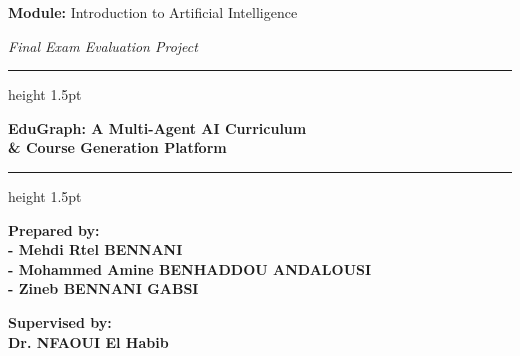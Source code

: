 \documentclass[12pt,a4paper]{report}
\begin{document}
\begin{titlepage}
    {\large \textbf{Module:} Introduction to Artificial Intelligence \par}
    {\small \textsl{Final Exam Evaluation Project} \par}

    \vspace{2cm}
    
    \hrule height 1.5pt
    \vspace{0.4cm}
    {\huge \bfseries \textcolor{academic_blue}{EduGraph: A Multi-Agent AI Curriculum \\ \& Course Generation Platform} \par}
    \vspace{0.4cm}
    \hrule height 1.5pt
    
    \vspace{2cm}
  
    
    \begin{minipage}{0.48\textwidth}
        \begin{flushleft} \large
            \textbf{\textcolor{academic_blue}{Prepared by:}} \\
            \vspace{0.2cm}
            \normalsize
            \textbf{ - Mehdi Rtel BENNANI} \\ \vspace{0.15cm}
            \textbf{ - Mohammed Amine BENHADDOU ANDALOUSI} \\ \vspace{0.15cm}
            \textbf{ - Zineb BENNANI GABSI} \\ \vspace{0.15cm}

        \end{flushleft}
    \end{minipage}
    \hfill
    \begin{minipage}{0.48\textwidth}
        \begin{flushright} \large
            \textbf{\textcolor{academic_blue}{Supervised by:}} \\
            \vspace{0.2cm}
            \normalsize
            \textbf{Dr. NFAOUI El Habib} \\
            \vspace{1.2cm} %
        \end{flushright}
    \end{minipage}
    

\end{titlepage}
\end{document}
